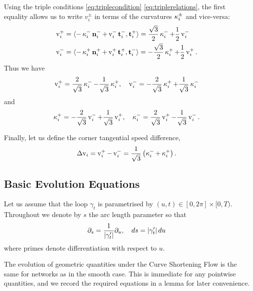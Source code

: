 \documentclass[11pt]{amsart}
\begin{document}
Using the triple conditions \eqref{eq:triplecondition} \eqref{eq:triplerelations}, the first equality allows us to write \(v_i^{\pm}\) in terms of the curvatures \(\operatorname{\kappa}_i^{\pm}\) and vice-versa:
\begin{align*}
\operatorname{v}_i^+ &= \langle{-\operatorname{\kappa}_i^- \operatorname{\mathbf{n}}_i^- + \operatorname{v}_i^- \operatorname{\mathbf{t}}_i^-},{\operatorname{\mathbf{t}}_i^+}\rangle = \frac{\sqrt{3}}{2} \operatorname{\kappa}_i^- + \frac{1}{2} \operatorname{v}_i^- \\
\operatorname{v}_i^- &= \langle{-\operatorname{\kappa}_i^+ \operatorname{\mathbf{n}}_i^+ + \operatorname{v}_i^+ \operatorname{\mathbf{t}}_i^+},{\operatorname{\mathbf{t}}_i^-}\rangle = - \frac{\sqrt{3}}{2} \operatorname{\kappa}_i^+ + \frac{1}{2} \operatorname{v}_i^+.
\end{align*}
Thus we have
\begin{equation}
\label{eq:tangspeedcurvture}
\operatorname{v}_i^+ = \frac{2}{\sqrt{3}} \operatorname{\kappa}_i^- - \frac{1}{\sqrt{3}} \operatorname{\kappa}_i^+, \quad \operatorname{v}_i^- = -\frac{2}{\sqrt{3}} \operatorname{\kappa}_i^+ + \frac{1}{\sqrt{3}} \operatorname{\kappa}_i^-
\end{equation}
and
\begin{equation}
\label{eq:curvturetangentialspeed}
\operatorname{\kappa}_i^+ = -\frac{2}{\sqrt{3}} \operatorname{v}_i^- + \frac{1}{\sqrt{3}} \operatorname{v}_i^+, \quad \operatorname{\kappa}_i^- = \frac{2}{\sqrt{3}} \operatorname{v}_i^+ - \frac{1}{\sqrt{3}} \operatorname{v}_i^-.
\end{equation}

Finally, let us define the corner tangential speed difference,
\begin{equation}
\label{eq:cornerspeed}
\operatorname{{\Delta v}}_i = \operatorname{v}_i^+ - \operatorname{v}_i^- = \frac{1}{\sqrt{3}} \left(\operatorname{\kappa}_i^- + \operatorname{\kappa}_i^+\right).
\end{equation}

\subsection{Basic Evolution Equations}
\label{sec:orgheadline4}

Let us assume that the loop \(\gamma_t\) is parametrised by \((u, t) \in [0, 2\pi] \times [0, T)\). Throughout we denote by \(s\) the arc length parameter so that
\[
\partial_s = \frac{1}{\left|\gamma_t'\right|} \partial_u, \quad ds = \left|\gamma_t'\right| du
\]
where primes denote differentiation with respect to \(u\).

The evolution of geometric quantities under the Curve Shortening Flow is the same for networks as in the smooth case. This is immediate for any pointwise quantities, and we record the required equations in a lemma for later convenience.
\end{document}
